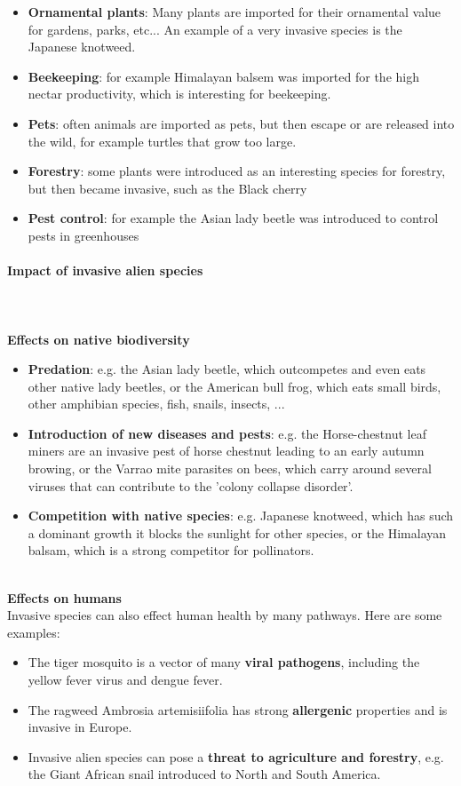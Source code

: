 \documentclass[../summary.tex]{subfiles}
\begin{document}
\begin{itemize}
	\item \textbf{Ornamental plants}: Many plants are imported for their ornamental value for gardens, parks, etc... An example of a very invasive species is the Japanese knotweed.
	\item \textbf{Beekeeping}: for example Himalayan balsem was imported for the high nectar productivity, which is interesting for beekeeping.
	\item \textbf{Pets}: often animals are imported as pets, but then escape or are released into the wild, for example turtles that grow too large. 
	\item \textbf{Forestry}: some plants were introduced as an interesting species for forestry, but then became invasive, such as the Black cherry
	\item \textbf{Pest control}: for example the Asian lady beetle was introduced to control pests in greenhouses
\end{itemize}

\paragraph{Impact of invasive alien species}
 \ \\\\
\textbf{Effects on native biodiversity}
\begin{itemize}
	\item \textbf{Predation}: e.g. the Asian lady beetle, which outcompetes and even eats other native lady beetles, or the American bull frog, which eats small birds, other amphibian species, fish, snails, insects, ...
	\item \textbf{Introduction of new diseases and pests}: e.g. the Horse-chestnut leaf miners are an invasive pest of horse chestnut leading to an early autumn browing, or the Varrao mite parasites on bees, which carry around several viruses that can contribute to the 'colony collapse disorder'.
	\item \textbf{Competition with native species}: e.g. Japanese knotweed, which has such a dominant growth it blocks the sunlight for other species, or the Himalayan balsam, which is a strong competitor for pollinators.
\end{itemize}
\ \\
\textbf{Effects on humans}\\
Invasive species can also effect human health by many pathways. Here are some examples:
\begin{itemize}
	\item The tiger mosquito is a vector of many \textbf{viral pathogens}, including the yellow fever virus and dengue fever.
	\item The ragweed Ambrosia artemisiifolia has strong \textbf{allergenic} properties and is invasive in Europe. 
	\item Invasive alien species can pose a \textbf{threat to agriculture and forestry}, e.g. the Giant African snail introduced to North and South America.
\end{itemize}
\end{document}
